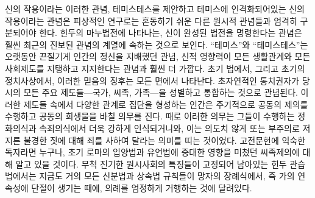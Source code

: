 신의 작용이라는 이러한 관념,
테미스테스를 제안하고 테미스에 인격화되어있는 신의 작용이라는 관념은
피상적인 연구로는 혼동하기 쉬운
다른 원시적 관념들과 엄격히 구분되어야 한다.
힌두의 마누법전에 나타나는, 신이 완성된 법전을 명령한다는 관념은
훨씬 최근의 진보된 관념의 계열에 속하는 것으로 보인다.
``테미스''와 ``테미스테스''는
오랫동안 끈질기게 인간의 정신을 지배했던 관념,
신적 영향력이 모든 생활관계와 모든 사회제도를 지탱하고 지지한다는 관념과
훨씬 더 가깝다.
초기 법에서, 그리고 초기의 정치사상에서,
이러한 믿음의 징후는 모든 면에서 나타난다.
초자연적인 통치권자가 당시의 모든 주요 제도들---국가, 씨족, 가족---을
성별하고 통합하는 것으로 관념된다.
이러한 제도들 속에서 다양한 관계로 집단을 형성하는 인간은
주기적으로 공동의 제의를 수행하고 공동의 희생물을 바칠 의무를 진다.
때로 이러한 의무는
그들이 수행하는 정화의식과 속죄의식에서
더욱 강하게 인식되거니와,
이는 의도치 않게 또는 부주의로 저지른 불경한 짓에 대해 죄를
사하여 달라는 의미를 띠는 것이었다.
고전문헌에 익숙한 독자라면 누구나,
초기 로마의 입양법과 유언법에 중대한 영향을 미쳤던
씨족제의에 대해 알고 있을 것이다.
무척 진기한 원시사회의 특징들이 고정되어 남아있는
힌두 관습법에서는 지금도 거의 모든 신분법과 상속법 규칙들이
망자의 장례식에서,
즉 가의 연속성에 단절이 생기는 때에,
의례를 엄정하게 거행하는 것에 달려있다.

